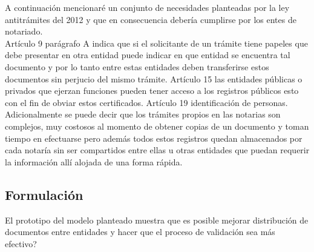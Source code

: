 A continuación mencionaré un conjunto de necesidades planteadas por la ley antitrámites del 2012 y que en consecuencia debería cumplirse por los entes de notariado.
\\
Artículo 9 parágrafo A indica que si el solicitante de un trámite tiene papeles que debe presentar en otra entidad puede indicar en que entidad se encuentra tal documento y por lo tanto entre estas entidades deben transferirse estos documentos sin perjucio del mismo trámite. Artículo 15 las entidades públicas o privados que ejerzan funciones pueden tener acceso a los registros públicos esto con el fin de obviar estos certificados. Artículo 19 identificación de personas.
\\
Adicionalmente se puede decir que los trámites propios en las notarias son complejos, muy costosos al momento de obtener copias de un documento y toman tiempo en efectuarse pero además todos estos registros quedan almacenados por cada notaría sin ser compartidos entre ellas u otras entidades que puedan requerir la información allí alojada de una forma rápida. 

\subsection{Formulación}
El prototipo del modelo planteado muestra que es posible mejorar distribución de documentos entre entidades  y hacer que el proceso de validación sea más efectivo?

